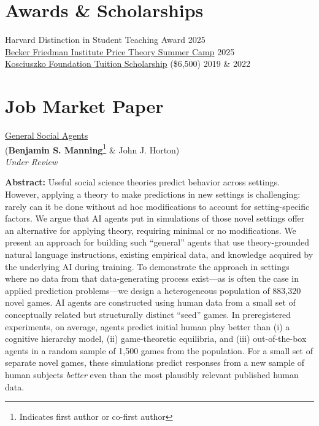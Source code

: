 \documentclass[margin,line,pifont,palatino,courier, 9pt]{res}
\begin{document}
\begin{resume}
\section{\sc Awards \& Scholarships}
Harvard Distinction in Student Teaching Award \hfill 2025 \\
\href{https://bfi.uchicago.edu/events/event/2025-price-theory-summer-camp/}{Becker Friedman Institute Price Theory Summer Camp} \hfill 2025 \\
\href{https://thekf.org/scholarship/tuition-scholarships/tuition-scholarships-for-graduate-studies/}{Kosciuszko Foundation Tuition Scholarship} (\$6,500) \hfill 2019 \& 2022 


\section{\sc Job Market Paper}

\href{https://benjaminmanning.io/files/optimize.pdf}{General Social Agents}\\
(\textbf{Benjamin S. Manning}\footnote{Indicates first author or co-first author} \& John J. Horton)\\
\textit{Under Review}

\begin{singlespace}
\footnotesize
\textbf{Abstract: } Useful social science theories predict behavior across settings. 
However, applying a theory to make predictions in new settings is challenging: rarely can it be done without ad hoc modifications to account for setting-specific factors.
We argue that AI agents put in simulations of those novel settings offer an alternative for applying theory, requiring minimal or no modifications.
We present an approach for building such ``general'' agents that use theory-grounded natural language instructions, existing empirical data, and knowledge acquired by the underlying AI during training.
To demonstrate the approach in settings where no data from that data-generating process exist---as is often the case in applied prediction problems---we design a heterogeneous population of 883,320 novel games.
AI agents are constructed using human data from a small set of conceptually related but structurally distinct ``seed'' games.
In preregistered experiments, on average, agents predict initial human play better than (i) a cognitive hierarchy model, (ii) game-theoretic equilibria, and (iii) out-of-the-box agents in a random sample of 1,500 games from the population.
For a small set of separate novel games, these simulations predict responses from a new sample of human subjects \emph{better} even than the most plausibly relevant published human data.
\end{singlespace}


\end{resume}
\end{document}

